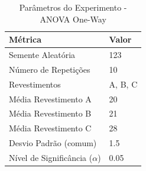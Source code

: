 \begin{table}[H]
\centering
\caption{Parâmetros do Experimento - ANOVA One-Way}
\label{tab:parametros_oneway}
\begin{tabular}{lp{8cm}}
\toprule
Métrica & Valor \\
\midrule
Semente Aleatória & 123 \\
Número de Repetições & 10 \\
Revestimentos & A, B, C \\
Média Revestimento A & 20 \\
Média Revestimento B & 21 \\
Média Revestimento C & 28 \\
Desvio Padrão (comum) & 1.5 \\
Nível de Significância ($\alpha$) & 0.05 \\
\bottomrule
\end{tabular}
\end{table}